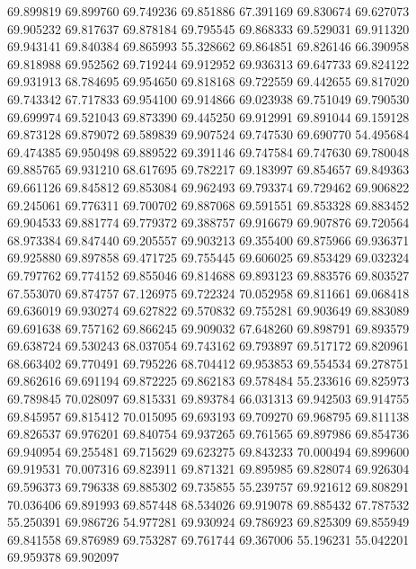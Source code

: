 69.899819
69.899760
69.749236
69.851886
67.391169
69.830674
69.627073
69.905232
69.817637
69.878184
69.795545
69.868333
69.529031
69.911320
69.943141
69.840384
69.865993
55.328662
69.864851
69.826146
66.390958
69.818988
69.952562
69.719244
69.912952
69.936313
69.647733
69.824122
69.931913
68.784695
69.954650
69.818168
69.722559
69.442655
69.817020
69.743342
67.717833
69.954100
69.914866
69.023938
69.751049
69.790530
69.699974
69.521043
69.873390
69.445250
69.912991
69.891044
69.159128
69.873128
69.879072
69.589839
69.907524
69.747530
69.690770
54.495684
69.474385
69.950498
69.889522
69.391146
69.747584
69.747630
69.780048
69.885765
69.931210
68.617695
69.782217
69.183997
69.854657
69.849363
69.661126
69.845812
69.853084
69.962493
69.793374
69.729462
69.906822
69.245061
69.776311
69.700702
69.887068
69.591551
69.853328
69.883452
69.904533
69.881774
69.779372
69.388757
69.916679
69.907876
69.720564
68.973384
69.847440
69.205557
69.903213
69.355400
69.875966
69.936371
69.925880
69.897858
69.471725
69.755445
69.606025
69.853429
69.032324
69.797762
69.774152
69.855046
69.814688
69.893123
69.883576
69.803527
67.553070
69.874757
67.126975
69.722324
70.052958
69.811661
69.068418
69.636019
69.930274
69.627822
69.570832
69.755281
69.903649
69.883089
69.691638
69.757162
69.866245
69.909032
67.648260
69.898791
69.893579
69.638724
69.530243
68.037054
69.743162
69.793897
69.517172
69.820961
68.663402
69.770491
69.795226
68.704412
69.953853
69.554534
69.278751
69.862616
69.691194
69.872225
69.862183
69.578484
55.233616
69.825973
69.789845
70.028097
69.815331
69.893784
66.031313
69.942503
69.914755
69.845957
69.815412
70.015095
69.693193
69.709270
69.968795
69.811138
69.826537
69.976201
69.840754
69.937265
69.761565
69.897986
69.854736
69.940954
69.255481
69.715629
69.623275
69.843233
70.000494
69.899600
69.919531
70.007316
69.823911
69.871321
69.895985
69.828074
69.926304
69.596373
69.796338
69.885302
69.735855
55.239757
69.921612
69.808291
70.036406
69.891993
69.857448
68.534026
69.919078
69.885432
67.787532
55.250391
69.986726
54.977281
69.930924
69.786923
69.825309
69.855949
69.841558
69.876989
69.753287
69.761744
69.367006
55.196231
55.042201
69.959378
69.902097

